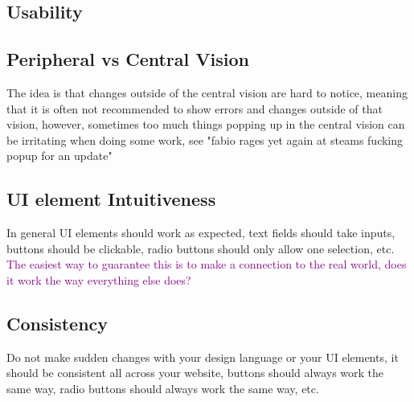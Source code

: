 \documentclass[main.tex,fontsize=6pt,paper=a4,paper=landscape,DIV=calc,]{scrartcl}
\begin{document}
\begin{multicols*}{4}
\section{Usability}

\subsection{Peripheral vs Central Vision}  
The idea is that changes outside of the central vision are hard to notice, meaning that it is often not recommended to show errors and changes outside of that vision, however, sometimes too much things popping up in the central vision can be irritating when doing some work, see "fabio rages yet again at steams fucking popup for an update"\newline

\subsection{UI element Intuitiveness}  
In general UI elements should work as expected, text fields should take inputs, buttons should be clickable, radio buttons should only allow one selection, etc.\newline
\textcolor{purple}{The easiest way to guarantee this is to make a connection to the real world, does it work the way everything else does?}

\subsection{Consistency}  
Do not make sudden changes with your design language or your UI elements, it should be consistent all across your website, buttons should always work the same way, radio buttons should always work the same way, etc.


\end{multicols*}
\end{document}
